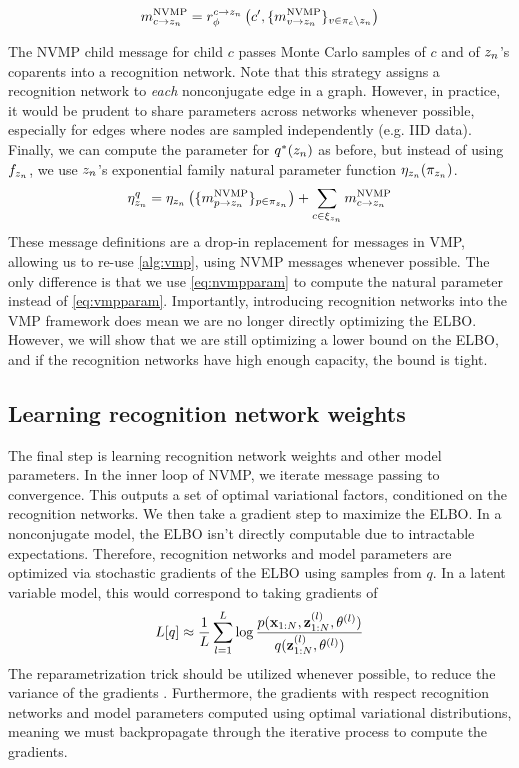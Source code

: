 \begin{equation}
    m^{\text{NVMP}}_{c \rightarrow z_n} = r^{c\rightarrow z_n}_{\phi}\left(
    c', \{m^{\text{NVMP}}_{v \rightarrow z_n}\}_{v \in \pi_c \backslash z_n}\right)
\end{equation}

The NVMP child message for child $c$ passes Monte Carlo samples
of $c$ and of $z_n$'s coparents into a recognition network.
Note that this strategy assigns a recognition
network to \emph{each} nonconjugate edge
in a graph. However, in practice,
it would be prudent to share parameters
across networks
whenever possible,
especially for edges where nodes are sampled
independently (e.g. IID data).
Finally, we can compute the parameter for $q^*(z_n)$
as before, but instead of using $f_{z_n}$, we use $z_n$'s
exponential family natural parameter function $\eta_{z_n}(\pi_{z_n})$.
\begin{equation}
    \label{eq:nvmpparam}
   \eta^q_{z_n} = \eta_{z_n}\left(\{m^{\text{NVMP}}_{p \rightarrow z_n}\}_{p \in \pi_{z_n}}\right) + \sum_{c \in \xi_{z_n}} m^{\text{NVMP}}_{c \rightarrow z_n}
\end{equation}
These message definitions are a drop-in replacement
for messages in VMP, allowing us to re-use \autoref{alg:vmp},
using NVMP messages whenever possible. The only
difference is that we use \autoref{eq:nvmpparam} to compute
the natural parameter instead of \autoref{eq:vmpparam}.
Importantly, introducing recognition networks
into the VMP framework does mean we are no longer
directly optimizing the ELBO. However, we will
show that we are still optimizing a lower
bound on the ELBO, and if the recognition networks
have high enough capacity, the bound is tight.

\subsection{Learning recognition network weights}
The final step is learning recognition network
weights and other model parameters.
In the inner loop of NVMP, we
iterate message passing to convergence.
This outputs a set of optimal variational
factors, conditioned on the recognition networks.
We then take a gradient step
to maximize the ELBO.
In a nonconjugate model, the ELBO isn't
directly computable due to intractable expectations.
Therefore, 
recognition networks and model parameters are optimized
via stochastic gradients of the ELBO using samples from $q$.
In a latent variable model, this would correspond to 
taking gradients of
\begin{equation}
    L[q] \approx \frac{1}{L}\sum_{l = 1}^L \log \frac{p(\mathbf{x}_{1:N}, \mathbf{z}_{1:N}^{(l)}, \theta^{(l)})}{q(\mathbf{z}_{1:N}^{(l)}, \theta^{(l)})}
\end{equation}
The reparametrization trick should be utilized whenever possible,
to reduce the variance of the gradients \citep{Kingma2014}.
Furthermore, the gradients with respect recognition networks
and model parameters computed using optimal variational
distributions, meaning we must backpropagate through
the iterative process to compute the gradients.

